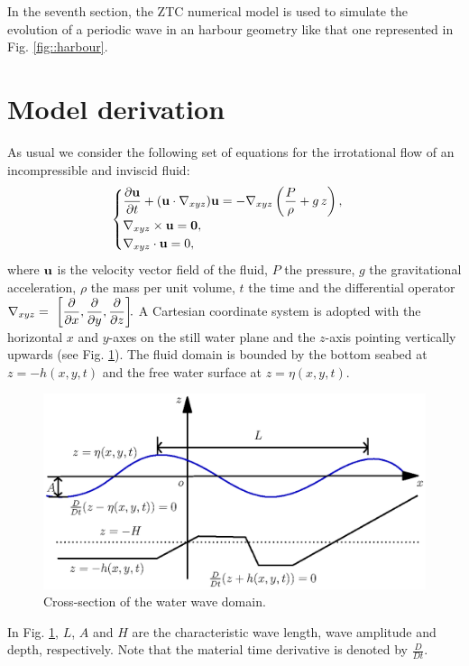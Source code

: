 In the seventh section,  the ZTC numerical
model is used to simulate
the evolution of a periodic wave in an harbour  geometry  like that one represented in Fig. \ref{fig::harbour}.


\section{Model derivation}
As usual  we consider the following set of
equations for the irrotational flow of an incompressible and inviscid fluid:
\begin{equation}\label{eq::euler}
\begin{cases}
\displaystyle\frac{\partial  {\bf u}}{\partial 
  t}+({\bf u}\cdot\nabla_{xyz}){\bf u}=-\nabla_{xyz}\left(\frac{P}{\rho} +g\, z\right),\\
\nabla_{xyz}\times {\bf u}={\bf 0},  \\
\nabla_{xyz}\cdot{{\bf u}}=0,
\end{cases}
\end{equation}
where \({\bf u}\) is the  velocity vector field of the fluid, \(P\) the
pressure, \(g\) the gravitational acceleration, \(\rho\) the
mass per unit volume, \(t\) the time and the differential operator \(\displaystyle\nabla_{xyz}=~\left[\frac{\partial }{\partial x},\frac{\partial }{\partial y},\frac{\partial }{\partial z}\right]\!\!.\)
A Cartesian coordinate system is adopted with the
horizontal  \(x\) and \(y\)-axes on the still water plane and
the \(z\)-axis pointing vertically upwards 
(see Fig. \ref{fig::schematic}). The fluid domain is
bounded by the  bottom seabed at \(z=-h(x,y,t)\) and the free
water surface at \(z=\eta(x,y,t)\). 


\begin{figure}[!htb]
{\centering
\includegraphics[width=12cm]{chapters/lopes/eps/graph.eps}
\caption{Cross-section of the water wave domain.}\label{fig::schematic}
\par}
\end{figure} 
In Fig. \ref{fig::schematic}, \(L\), \(A\) and \(H\) are
the characteristic wave length, wave amplitude and
depth, respectively. Note that the material time derivative is
denoted by \(\frac{D}{D t}\). 
  
